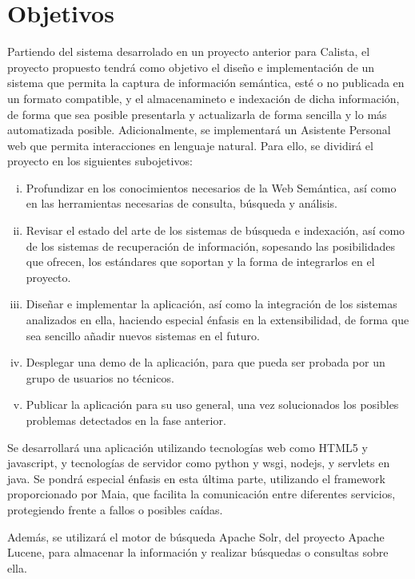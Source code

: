 \documentclass[a4paper,11pt]{report}
\begin{document}
\chapter*{Objetivos}\vspace{-1ex}

Partiendo del sistema desarrolado en un proyecto anterior para Calista\cite{jherrera13}, el proyecto propuesto tendrá como objetivo el diseño e implementación de un sistema que permita la captura de información semántica, esté o no publicada en un formato compatible, y el almacenamineto e indexación de dicha información, de forma que sea posible presentarla y actualizarla de forma sencilla y lo más automatizada posible. Adicionalmente, se implementará un Asistente Personal web que permita interacciones en lenguaje natural.
Para ello, se dividirá el proyecto en los siguientes subojetivos:

\begin{enumerate}[i.]
  \item Profundizar en los conocimientos necesarios de la Web Semántica, así como en las herramientas necesarias de consulta, búsqueda y análisis.
  \item Revisar el estado del arte de los sistemas de búsqueda e indexación, así como de los sistemas de recuperación de información, sopesando las posibilidades que ofrecen, los estándares que soportan y la forma de integrarlos en el proyecto.
  \item Diseñar e implementar la aplicación, así como la integración de los sistemas analizados en ella, haciendo especial énfasis en la extensibilidad, de forma que sea sencillo añadir nuevos sistemas en el futuro.
  \item Desplegar una demo de la aplicación, para que pueda ser probada por un grupo de usuarios no técnicos.
  \item Publicar la aplicación para su uso general, una vez solucionados los posibles problemas detectados en la fase anterior.
\end{enumerate}


Se desarrollará una aplicación utilizando tecnologías web como HTML5 y javascript, y tecnologías de servidor como python y wsgi, nodejs, y servlets en java. Se pondrá especial énfasis en esta última parte, utilizando el framework proporcionado por Maia\cite{maia14}, que facilita la comunicación entre diferentes servicios, protegiendo frente a fallos o posibles caídas.

Además, se utilizará el motor de búsqueda Apache Solr\cite{solr}, del proyecto Apache Lucene\cite{lucene}, para almacenar la información y realizar búsquedas o consultas sobre ella.
\end{document}
